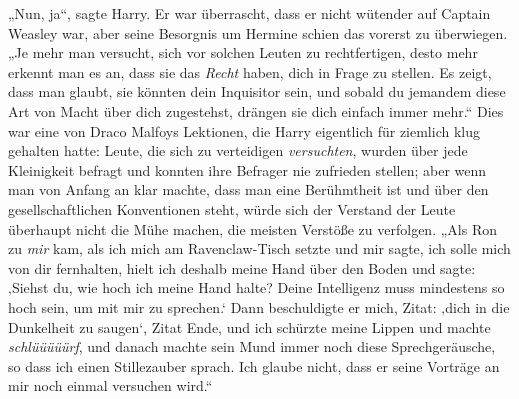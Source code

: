 „Nun, ja“, sagte Harry. Er war überrascht, dass er nicht wütender auf Captain Weasley war, aber seine Besorgnis um Hermine schien das vorerst zu überwiegen. „Je mehr man versucht, sich vor solchen Leuten zu rechtfertigen, desto mehr erkennt man es an, dass sie das \emph{Recht} haben, dich in Frage zu stellen. Es zeigt, dass man glaubt, sie könnten dein Inquisitor sein, und sobald du jemandem diese Art von Macht über dich zugestehst, drängen sie dich einfach immer mehr.“ Dies war eine von Draco Malfoys Lektionen, die Harry eigentlich für ziemlich klug gehalten hatte: Leute, die sich zu verteidigen \emph{versuchten}, wurden über jede Kleinigkeit befragt und konnten ihre Befrager nie zufrieden stellen; aber wenn man von Anfang an klar machte, dass man eine Berühmtheit ist und über den gesellschaftlichen Konventionen steht, würde sich der Verstand der Leute überhaupt nicht die Mühe machen, die meisten Verstöße zu verfolgen. „Als Ron zu \emph{mir} kam, als ich mich am Ravenclaw-Tisch setzte und mir sagte, ich solle mich von dir fernhalten, hielt ich deshalb meine Hand über den Boden und sagte: ‚Siehst du, wie hoch ich meine Hand halte? Deine Intelligenz muss mindestens so hoch sein, um mit mir zu sprechen.‘ Dann beschuldigte er mich, Zitat: ‚dich in die Dunkelheit zu saugen‘, Zitat Ende, und ich schürzte meine Lippen und machte \emph{schlüüüüürf}, und danach machte sein Mund immer noch diese Sprechgeräusche, so dass ich einen Stillezauber sprach. Ich glaube nicht, dass er seine Vorträge an mir noch einmal versuchen wird.“

